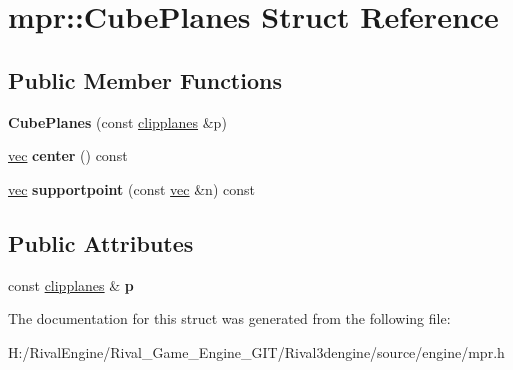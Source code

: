\hypertarget{structmpr_1_1_cube_planes}{}\section{mpr\+:\+:Cube\+Planes Struct Reference}
\label{structmpr_1_1_cube_planes}
\subsection*{Public Member Functions}
\begin{DoxyCompactItemize}
\item 
\mbox{\label{structmpr_1_1_cube_planes_ae7449b116f141ab759caa8c165ba4cf9}} 
{\bfseries Cube\+Planes} (const \hyperlink{structclipplanes}{clipplanes} \&p)
\item 
\mbox{\label{structmpr_1_1_cube_planes_affdb7130f5b9aac9e02383178b2228b6}} 
\hyperlink{structvec}{vec} {\bfseries center} () const
\item 
\mbox{\label{structmpr_1_1_cube_planes_afa39bf3c3c76ea0bb9b980596377cf1d}} 
\hyperlink{structvec}{vec} {\bfseries supportpoint} (const \hyperlink{structvec}{vec} \&n) const
\end{DoxyCompactItemize}
\subsection*{Public Attributes}
\begin{DoxyCompactItemize}
\item 
\mbox{\label{structmpr_1_1_cube_planes_ade5e3cc64d6a3d993acc7b60ee585412}} 
const \hyperlink{structclipplanes}{clipplanes} \& {\bfseries p}
\end{DoxyCompactItemize}


The documentation for this struct was generated from the following file\+:\begin{DoxyCompactItemize}
\item 
H\+:/\+Rival\+Engine/\+Rival\+\_\+\+Game\+\_\+\+Engine\+\_\+\+G\+I\+T/\+Rival3dengine/source/engine/mpr.\+h\end{DoxyCompactItemize}
